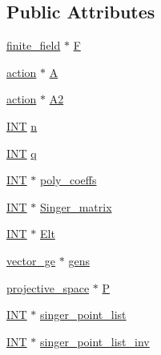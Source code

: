 \subsection*{Public Attributes}
\begin{DoxyCompactItemize}
\item 
\mbox{\hyperlink{classfinite__field}{finite\+\_\+field}} $\ast$ \mbox{\hyperlink{classsinger__cycle_a863c648286d6bec6fb09c10f642aa5e7}{F}}
\item 
\mbox{\hyperlink{classaction}{action}} $\ast$ \mbox{\hyperlink{classsinger__cycle_a5713ae53a0be8a6f6511cad8be752350}{A}}
\item 
\mbox{\hyperlink{classaction}{action}} $\ast$ \mbox{\hyperlink{classsinger__cycle_a022567c51585251ed3c122a16d4fe156}{A2}}
\item 
\mbox{\hyperlink{galois_8h_a09fddde158a3a20bd2dcadb609de11dc}{I\+NT}} \mbox{\hyperlink{classsinger__cycle_aaec1b564faa026e9aae152723757b6dc}{n}}
\item 
\mbox{\hyperlink{galois_8h_a09fddde158a3a20bd2dcadb609de11dc}{I\+NT}} \mbox{\hyperlink{classsinger__cycle_acf43c91893a248fa744ba90c825fbfbf}{q}}
\item 
\mbox{\hyperlink{galois_8h_a09fddde158a3a20bd2dcadb609de11dc}{I\+NT}} $\ast$ \mbox{\hyperlink{classsinger__cycle_a46b9867155974b6c1c9e97260a7dd23f}{poly\+\_\+coeffs}}
\item 
\mbox{\hyperlink{galois_8h_a09fddde158a3a20bd2dcadb609de11dc}{I\+NT}} $\ast$ \mbox{\hyperlink{classsinger__cycle_a79a1251fba22d6caaaf82a9550cb1b28}{Singer\+\_\+matrix}}
\item 
\mbox{\hyperlink{galois_8h_a09fddde158a3a20bd2dcadb609de11dc}{I\+NT}} $\ast$ \mbox{\hyperlink{classsinger__cycle_a426be1a26d15a84a7b0eaf2843167793}{Elt}}
\item 
\mbox{\hyperlink{classvector__ge}{vector\+\_\+ge}} $\ast$ \mbox{\hyperlink{classsinger__cycle_adcd7f7917c64a66ce8d26ea27d91e378}{gens}}
\item 
\mbox{\hyperlink{classprojective__space}{projective\+\_\+space}} $\ast$ \mbox{\hyperlink{classsinger__cycle_a756303bf8d6a7ee315e2638e9eaf40d2}{P}}
\item 
\mbox{\hyperlink{galois_8h_a09fddde158a3a20bd2dcadb609de11dc}{I\+NT}} $\ast$ \mbox{\hyperlink{classsinger__cycle_a854718c99bfab8003620c18be530a7a9}{singer\+\_\+point\+\_\+list}}
\item 
\mbox{\hyperlink{galois_8h_a09fddde158a3a20bd2dcadb609de11dc}{I\+NT}} $\ast$ \mbox{\hyperlink{classsinger__cycle_a0b4243bb7c407eb2e6d8aad287360c6b}{singer\+\_\+point\+\_\+list\+\_\+inv}}

\end{DoxyCompactItemize}

